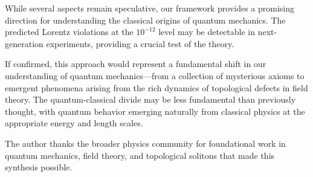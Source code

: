 ﻿\documentclass[twocolumn,showpacs,preprintnumbers,amsmath,amssymb,prd]{revtex4-2}
\begin{document}
While several aspects remain speculative, our framework provides a promising direction for understanding the classical origins of quantum mechanics. The predicted Lorentz violations at the $10^{-12}$ level may be detectable in next-generation experiments, providing a crucial test of the theory.

If confirmed, this approach would represent a fundamental shift in our understanding of quantum mechanics---from a collection of mysterious axioms to emergent phenomena arising from the rich dynamics of topological defects in field theory. The quantum-classical divide may be less fundamental than previously thought, with quantum behavior emerging naturally from classical physics at the appropriate energy and length scales.

\acknowledgments

The author thanks the broader physics community for foundational work in quantum mechanics, field theory, and topological solitons that made this synthesis possible.
\end{document}

